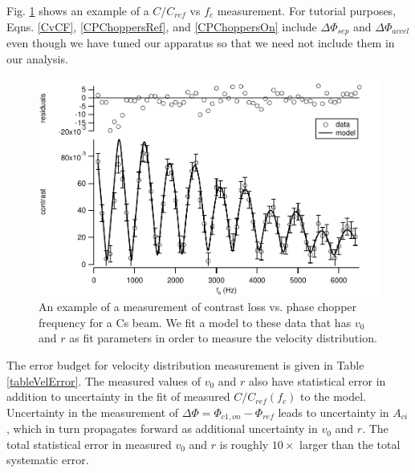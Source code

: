 \documentclass[twocolumn,prl,showpacs,superscriptaddress]{revtex4-1}   %
\newcommand{\figref}[1]{Fig. \ref{#1}}
\begin{document}
\figref{CvCFExample} shows an example of a $C/C_{ref}$ vs $f_c$ measurement. 
For tutorial purposes, Eqns. \eqref{CvCF}, \eqref{CPChoppersRef}, and \eqref{CPChoppersOn} include $\Delta\Phi_{sep}$ and $\Delta\Phi_{accel}$ even though we have tuned our apparatus so that we need not include them in our analysis.

\begin{figure}
\includegraphics[width=\linewidth,keepaspectratio]{CvCF_150420_o.pdf}
\caption{\label{CvCFExample}An example of a measurement of contrast loss vs. phase chopper frequency for a Cs beam. We fit a model to these data that has $v_0$ and $r$ as fit parameters in order to measure the velocity distribution.}
\end{figure}
	
The error budget for velocity distribution measurement is given in Table \ref{tableVelError}. The measured values of $v_0$ and $r$ also have statistical error in addition to uncertainty in the fit of measured $C/C_{ref}(f_c)$ to the model. Uncertainty in the measurement of $\Delta\Phi = \Phi_{c1,on} - \Phi_{ref}$ leads to uncertainty in $A_{ci}$, which in turn propagates forward as additional uncertainty in $v_0$ and $r$. The total statistical error in measured $v_0$ and $r$ is roughly $10\times$ larger than the total systematic error.
\end{document}
